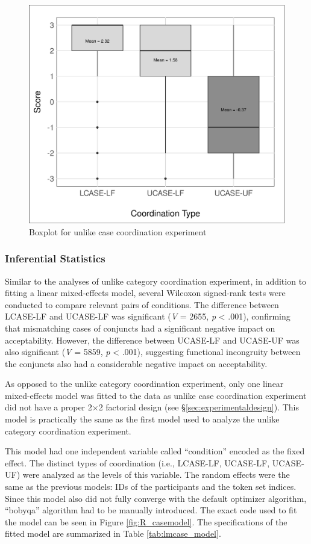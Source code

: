 \begin{figure}[!h]
	\centering
	\includegraphics[width=0.88\linewidth]{images/updated_experiment/caseboxplot.png}
	\caption{Boxplot for unlike case coordination experiment}
	\label{fig:lmcase}
\end{figure}


\subsubsection{Inferential Statistics}

Similar to the analyses of unlike category coordination experiment, in addition to fitting a linear mixed-effects model, several Wilcoxon signed-rank tests were conducted to compare relevant pairs of conditions. The difference between LCASE-LF and UCASE-LF was significant (\textit{V} = 2655, \textit{p} < .001), confirming that mismatching cases of conjuncts had a significant negative impact on acceptability. However, the difference between UCASE-LF and UCASE-UF was also significant (\textit{V} = 5859, \textit{p} < .001), suggesting functional incongruity between the conjuncts also had a considerable negative impact on acceptability.

As opposed to the unlike category coordination experiment, only one linear mixed-effects model was fitted to the data as unlike case coordination experiment did not have a proper 2$\times$2 factorial design (see \S \ref{sec:experimentaldesign}). This model is practically the same as the first model used to analyze the unlike category coordination experiment.

This model had one independent variable called ``condition'' encoded as the fixed effect. The distinct types of coordination (i.e., LCASE-LF, UCASE-LF, UCASE-UF) were analyzed as the levels of this variable. The random effects were the same as the previous models: IDs of the participants and the token set indices. Since this model also did not fully converge with the default optimizer algorithm, ``bobyqa'' algorithm had to be manually introduced. The exact code used to fit the model can be seen in Figure \ref{fig:R_casemodel}. The specifications of the fitted model are summarized in Table \ref{tab:lmcase_model}. 

